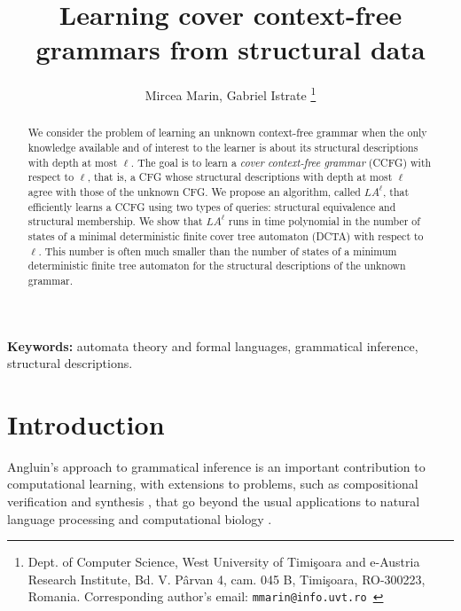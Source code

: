 \documentclass[preprint,12pt,english]{article}
\begin{document}
\title{Learning cover context-free grammars from structural data}



\author{ Mircea Marin, 
Gabriel Istrate \footnote {Dept. of Computer Science, West University of Timi\c{s}oara and e-Austria Research Institute, Bd. V. P\^{a}rvan 4, cam. 045
B, Timi\c{s}oara, RO-300223, Romania. Corresponding author's email: {\tt mmarin@info.uvt.ro }}}



\maketitle
\begin{abstract}
We consider the problem of learning an unknown context-free grammar when the only knowledge available and of interest to the learner is about its structural descriptions with  depth at most $\ell.$ The goal is to learn a {\em cover context-free grammar} (CCFG) with respect to $\ell$, that is, a CFG whose structural descriptions with depth at most $\ell$ agree with those of the unknown CFG. 
We propose an algorithm, called $LA^\ell$,  that efficiently learns a CCFG using two types of queries: structural equivalence  and structural membership. 
We show that  $LA^\ell$ runs in time polynomial in the number of states of a minimal deterministic finite cover tree automaton (DCTA) with respect to $\ell$. This number is often much smaller than the number of states of a minimum deterministic finite tree automaton for the structural descriptions of the unknown grammar. 
\end{abstract}

{\bf Keywords:} automata theory and formal languages, grammatical inference, structural descriptions.


\section{Introduction}

Angluin's approach to grammatical inference \cite{Angluin:87} is an important contribution to computational learning, with extensions to problems, such as compositional verification and synthesis \cite{farzan2008extending,maler1995learnability}, that go beyond the usual applications to natural language processing and computational biology \cite{de2010grammatical}. 
\end{document}
